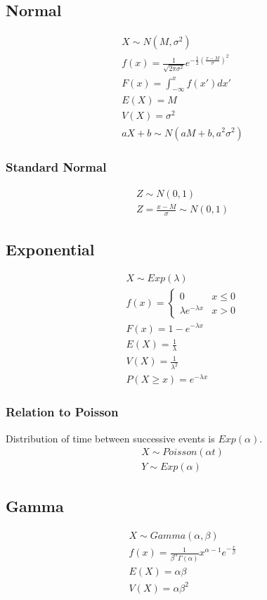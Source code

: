 \subsection{Normal}
\begin{align}
  X \sim N(M, \sigma^2) \\
  f(x) = \frac{1}{\sqrt{2\pi\sigma^2}}e^{-\frac{1}{2}(\frac{x - M}{\sigma})^2} \\
  F(x) = \int_{-\infty}^{x} f(x') dx' \\
  E(X) = M \\
  V(X) = \sigma^2 \\
  aX + b \sim N(aM + b, a^2\sigma^2)
\end{align}

\subsubsection{Standard Normal}
\begin{align}
  Z \sim N(0, 1) \\
  Z = \frac{x - M}{\sigma} \sim N(0, 1)
\end{align}

\subsection{Exponential}
\begin{align}
  X \sim Exp(\lambda) \\
  f(x) = \begin{cases}
    0 & x \leq 0 \\
    \lambda e^{-\lambda x} & x > 0
  \end{cases} \\
  F(x) = 1 - e^{-\lambda x} \\
  E(X) = \frac{1}{\lambda} \\
  V(X) = \frac{1}{\lambda^2} \\
  P(X \geq x) = e^{-\lambda x}
\end{align}

\subsubsection{Relation to Poisson}
Distribution of time between successive events is $Exp(\alpha)$.
\begin{align}
  X \sim Poisson(\alpha t) \\
  Y \sim Exp(\alpha)
\end{align}

\subsection{Gamma}
\begin{align}
  X \sim Gamma(\alpha, \beta) \\
  f(x) = \frac{1}{\beta^{\alpha}\Gamma(\alpha)}x^{\alpha - 1}e^{-\frac{x}{\beta}} \\
  E(X) = \alpha\beta \\
  V(X) = \alpha\beta^2
\end{align}

